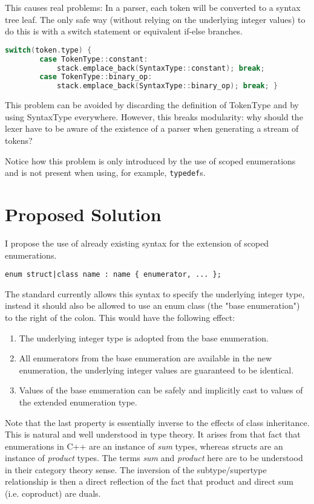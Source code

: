 \documentclass{scrartcl}
\begin{document}
\noindent
This causes real problems: In a parser, each token will be converted to a syntax tree leaf.
The only safe way (without relying on the underlying integer values) to do this is with a switch statement or equivalent if-else branches.

\begin{lstlisting}[language=C++]
    switch(token.type) {
        case TokenType::constant: 
            stack.emplace_back(SyntaxType::constant); break;
        case TokenType::binary_op:
            stack.emplace_back(SyntaxType::binary_op); break; }
\end{lstlisting}
\noindent
This problem can be avoided by discarding the definition of TokenType and by using SyntaxType everywhere.
However, this breaks modularity: why should the lexer have to be aware of the existence of a parser when generating a stream of tokens?

Notice how this problem is only introduced by the use of scoped enumerations and is not present when using, for example, \texttt{typedef}s.

\section{Proposed Solution}
I propose the use of already existing syntax for the extension of scoped enumerations.

\begin{lstlisting}[language={}]
    enum struct|class name : name { enumerator, ... };
\end{lstlisting}

\noindent
The standard currently allows this syntax to specify the underlying integer type, instead it should also be allowed to use an enum class (the "base enumeration") to the right of the colon.
This would have the following effect:
\begin{enumerate}
\item The underlying integer type is adopted from the base enumeration.
\item All enumerators from the base enumeration are available in the new enumeration, the underlying integer values are guaranteed to be identical.
\item Values of the base enumeration can be safely and implicitly cast to values of the extended enumeration type.
\end{enumerate}

\noindent
Note that the last property is essentially inverse to the effects of class inheritance.
This is natural and well understood in type theory.
It arises from that fact that enumerations in C++ are an instance of {\em sum} types, whereas structs are an instance of {\em product} types.
The terms {\em sum} and {\em product} here are to be understood in their category theory sense.
The inversion of the subtype/supertype relationship is then a direct reflection of the fact that product and direct sum (i.e. coproduct) are duals.
\end{document}
